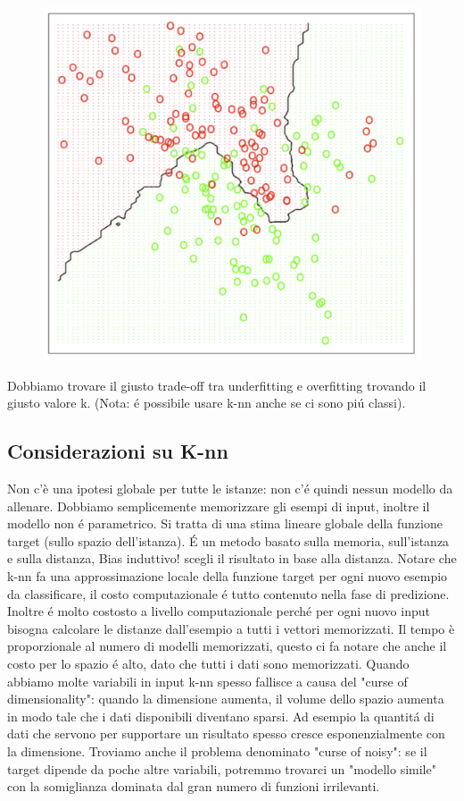 \documentclass{article}
\begin{document}
\begin{figure}[H]
\centering
\includegraphics[scale=0.4]{Images/15-nn.png}
\end{figure}

Dobbiamo trovare il giusto trade-off tra underfitting e overfitting trovando il giusto valore k. (Nota: é possibile usare k-nn anche se ci sono piú classi). \newline
\subsection{Considerazioni su K-nn}
Non c'è una ipotesi globale per tutte le istanze: non c'é quindi nessun modello da allenare. Dobbiamo semplicemente memorizzare gli esempi di input, inoltre il modello non é parametrico. Si tratta di una stima lineare globale della funzione target (sullo spazio dell'istanza). É un metodo basato sulla memoria, sull'istanza e sulla distanza, Bias induttivo! scegli il risultato in base alla distanza. \newline
Notare che k-nn fa una approssimazione locale della funzione target per ogni nuovo esempio da classificare, il costo computazionale é tutto contenuto nella fase di predizione. Inoltre é molto costosto a livello computazionale perché per ogni nuovo input bisogna calcolare le distanze dall'esempio a tutti i vettori memorizzati. Il tempo è proporzionale al numero di modelli memorizzati, questo ci fa notare che anche il costo per lo spazio é alto, dato che tutti i dati sono memorizzati. \newline
Quando abbiamo molte variabili in input k-nn spesso fallisce a causa del "curse of dimensionality": quando la dimensione aumenta, il volume dello spazio aumenta in modo tale che i dati disponibili diventano sparsi. Ad esempio la quantitá di dati che servono per supportare un risultato spesso cresce esponenzialmente con la dimensione. Troviamo anche il problema denominato "curse of noisy": se il target dipende da poche altre variabili, potremmo trovarci un "modello simile" con la somiglianza dominata dal gran numero di funzioni irrilevanti. 
\end{document}
